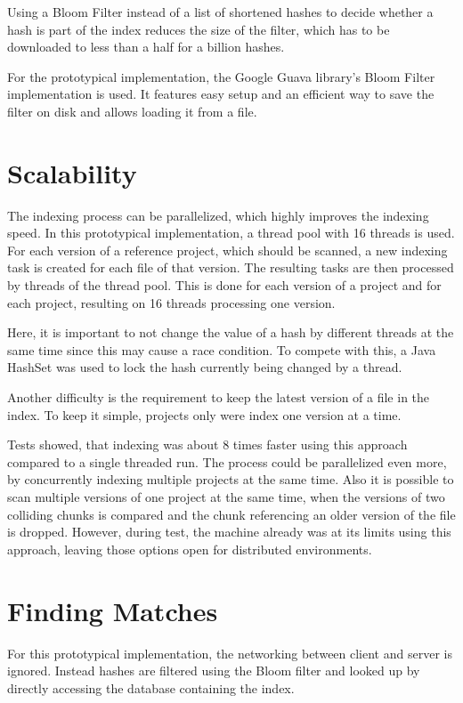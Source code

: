 Using a Bloom Filter instead of a list of shortened hashes to decide whether a hash is part of the index reduces the size of the filter, which has to be downloaded to less than a half for a billion hashes.

For the prototypical implementation, the Google Guava library's Bloom Filter implementation is used.
It features easy setup and an efficient way to save the filter on disk and allows loading it from a file.

\section{Scalability}\label{section:implementation/scalability}
The indexing process can be parallelized, which highly improves the indexing speed.
In this prototypical implementation, a thread pool with 16 threads is used.
For each version of a reference project, which should be scanned, a new indexing task is created for each file of that version.
The resulting tasks are then processed by threads of the thread pool.
This is done for each version of a project and for each project, resulting on 16 threads processing one version.

Here, it is important to not change the value of a hash by different threads at the same time since this may cause a race condition.
To compete with this, a Java HashSet was used to lock the hash currently being changed by a thread.

Another difficulty is the requirement to keep the latest version of a file in the index.
To keep it simple, projects only were index one version at a time.

Tests showed, that indexing was about 8 times faster using this approach compared to a single threaded run.
The process could be parallelized even more, by concurrently indexing multiple projects at the same time.
Also it is possible to scan multiple versions of one project at the same time, when the versions of two colliding chunks is compared and the chunk referencing an older version of the file is dropped.
However, during test, the machine already was at its limits using this approach, leaving those options open for distributed environments.

\section{Finding Matches}\label{section:implementation/finding_matches}
For this prototypical implementation, the networking between client and server is ignored.
Instead hashes are filtered using the Bloom filter and looked up by directly accessing the database containing the index.

